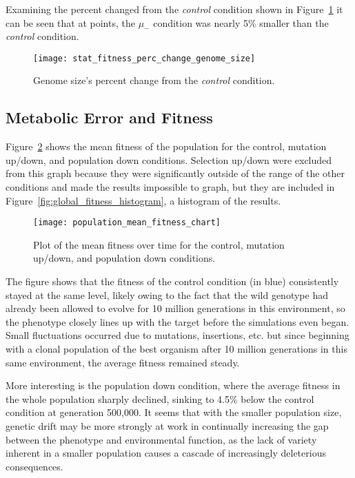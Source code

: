 Examining the percent changed from the \textit{control} condition shown in Figure~\ref{fig:genome_size_percent_change} it can be seen that at points, the $\mu_-$ condition was nearly 5\% smaller than the \textit{control} condition. 

\begin{figure}[H]
	\centering
	\texttt{[image: stat\_fitness\_perc\_change\_genome\_size]}
	\caption[Genome size - percent change]{Genome size's percent change from the \textit{control} condition.}
	\label{fig:genome_size_percent_change}
\end{figure}


\subsection{Metabolic Error and Fitness}
Figure~\ref{fig:mean_fitness_plot} shows the mean fitness of the population for the control, mutation up/down, and population down conditions. Selection up/down were excluded from this graph because they were significantly outside of the range of the other conditions and made the results impossible to graph, but they are included in Figure~\ref{fig:global_fitness_histogram}, a histogram of the results.

\begin{figure}[H]
	\texttt{[image: population\_mean\_fitness\_chart]}
	\caption[Mean fitness]{Plot of the mean fitness over time for the control, mutation up/down, and population down conditions.}
	\label{fig:mean_fitness_plot}
\end{figure}

The figure shows that the fitness of the control condition (in blue) consistently stayed at the same level, likely owing to the fact that the wild genotype had already been allowed to evolve for 10 million generations in this environment, so the phenotype closely lines up with the target before the simulations even began. Small fluctuations occurred due to mutations, insertions, etc. but since beginning with a clonal population of the best organism after 10 million generations in this same environment, the average fitness remained steady. 

More interesting is the population down condition, where the average fitness in the whole population sharply declined, sinking to 4.5\% below the control condition at generation 500,000. It seems that with the smaller population size, genetic drift may be more strongly at work in continually increasing the gap between the phenotype and environmental function, as the lack of variety inherent in a smaller population causes a cascade of increasingly deleterious consequences. 

